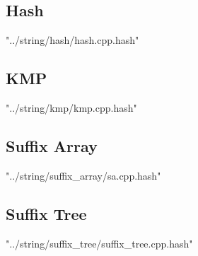 \documentclass [a4paper,5pt,oneside, landscape]{article}
\begin{document}
\begin{multicols}{3}
\subsection{ Hash}
 {"../string/hash/hash.cpp.hash"}


\subsection{ KMP}
 {"../string/kmp/kmp.cpp.hash"}


\subsection{ Suffix Array}
 {"../string/suffix_array/sa.cpp.hash"}


\subsection{ Suffix Tree}
 {"../string/suffix_tree/suffix_tree.cpp.hash"}

\end{multicols}
\end{document}
